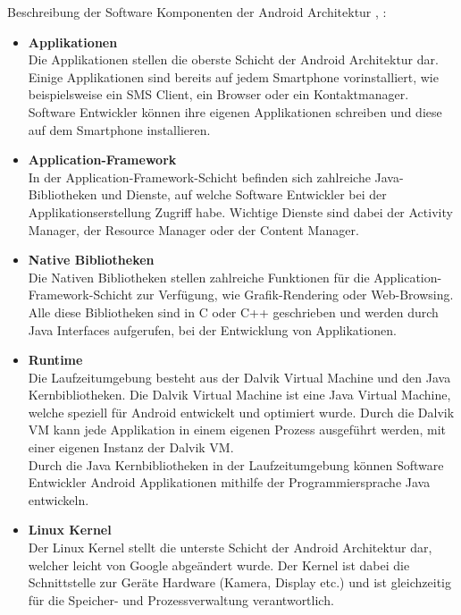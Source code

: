 Beschreibung der Software Komponenten der Android Architektur \cite{overviewAndroid:singh}, \cite{androidTutorialOS}: 
\begin{itemize}
	\item \textbf{Applikationen}\\
	Die Applikationen stellen die oberste Schicht der Android Architektur dar. Einige Applikationen sind bereits auf jedem Smartphone vorinstalliert, wie beispielsweise ein SMS Client,  ein Browser oder ein Kontaktmanager. Software Entwickler können ihre eigenen Applikationen schreiben und diese auf dem Smartphone installieren.
	\item \textbf{Application-Framework}\\
    In der Application-Framework-Schicht befinden sich zahlreiche Java-Bibliotheken und Dienste, auf welche Software Entwickler bei der Applikationserstellung Zugriff habe. Wichtige Dienste sind dabei der Activity Manager, der Resource Manager oder der Content Manager.
	\item \textbf{Native Bibliotheken}\\
	Die Nativen Bibliotheken stellen zahlreiche Funktionen für die Application-Framework-Schicht zur Verfügung, wie Grafik-Rendering oder Web-Browsing. Alle diese Bibliotheken sind in C oder C++ geschrieben und werden durch Java Interfaces aufgerufen, bei der Entwicklung von Applikationen.
	\item \textbf{Runtime}\\
	Die Laufzeitumgebung besteht aus der Dalvik Virtual Machine und den Java Kernbibliotheken. Die Dalvik Virtual Machine ist eine Java Virtual Machine, welche speziell für Android entwickelt und optimiert wurde.  Durch die  Dalvik VM kann jede Applikation in einem eigenen Prozess ausgeführt werden, mit einer eigenen Instanz der Dalvik VM. \\
	Durch die Java Kernbibliotheken in der Laufzeitumgebung können Software Entwickler Android Applikationen mithilfe der Programmiersprache Java entwickeln.   
	\item \textbf{Linux Kernel}\\
	Der Linux Kernel stellt die unterste Schicht der Android Architektur dar, welcher leicht von Google abgeändert wurde. Der Kernel ist dabei die Schnittstelle zur Geräte Hardware (Kamera, Display etc.) und ist gleichzeitig für die Speicher- und Prozessverwaltung verantwortlich.
\end{itemize}
	

